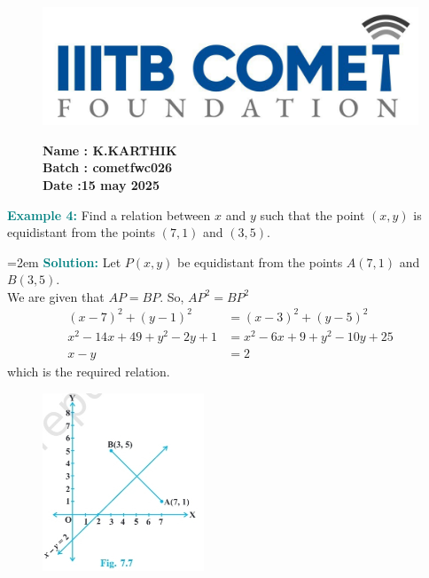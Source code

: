 \documentclass[12pt]{article}
\title{}
\date{}
\begin{document}
\begin{figure}[h!]
    \begin{minipage}{0.45\textwidth}  %
        \includegraphics[width=\textwidth]{sun.png}  %
    \end{minipage} \hfill
    \begin{minipage}{0.45\textwidth}  %
        \textbf{Name : K.KARTHIK} \\
    \textbf{Batch : cometfwc026} \\
  \textbf{Date :15 may 2025}
    \end{minipage}
\end{figure}
\noindent\textcolor{teal}{\large\textbf{Example 4:}} Find a relation between $x$ and $y$ such that the point $(x, y)$ is equidistant from the points $(7, 1)$ and $(3, 5)$.

\vspace{1em}
{\hangindent=2em
\noindent\textcolor{teal}{\textbf{Solution:}} Let $P(x, y)$ be equidistant from the points $A(7, 1)$ and $B(3, 5)$.\\
We are given that $AP = BP$. So, $AP^2 = BP^2$
\begin{align*}
(x - 7)^2 + (y - 1)^2 &= (x - 3)^2 + (y - 5)^2 \\
x^2 - 14x + 49 + y^2 - 2y + 1 &= x^2 - 6x + 9 + y^2 - 10y + 25 \\
x - y &= 2
\end{align*}
which is the required relation.
}

\begin{figure}
    \centering
    \vspace{-5pt}
    \includegraphics[width=0.43\textwidth]{tree.png}
    \vspace{-5pt}
\end{figure}
\end{document}
